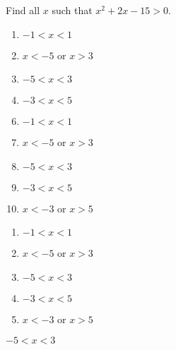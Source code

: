 


  Find all $x$ such that $x^{2}+2x-15>0$. %


\ifsat
	\begin{enumerate}[label=\Alph*)]
		\item   $-1<x<1$ 
		\item  $x<-5$ or $x>3$%
		\item  $-5<x<3$%
		\item  $-3<x<5$
	\end{enumerate}
\else
\fi

\ifacteven
	\begin{enumerate}[label=\textbf{\Alph*.},itemsep=\fill,align=left]
		\setcounter{enumii}{5}
		\item   $-1<x<1$ 
		\item  $x<-5$ or $x>3$%
		\item  $-5<x<3$%
		\addtocounter{enumii}{1}
		\item  $-3<x<5$
		\item  $x<-3$ or $x>5$
	\end{enumerate}
\else
\fi

\ifactodd
	\begin{enumerate}[label=\textbf{\Alph*.},itemsep=\fill,align=left]
		\item   $-1<x<1$ 
		\item  $x<-5$ or $x>3$%
		\item  $-5<x<3$%
		\item  $-3<x<5$
		\item  $x<-3$ or $x>5$
	\end{enumerate}
\else
\fi

\ifgridin
  $-5<x<3$%
		
\else
\fi

